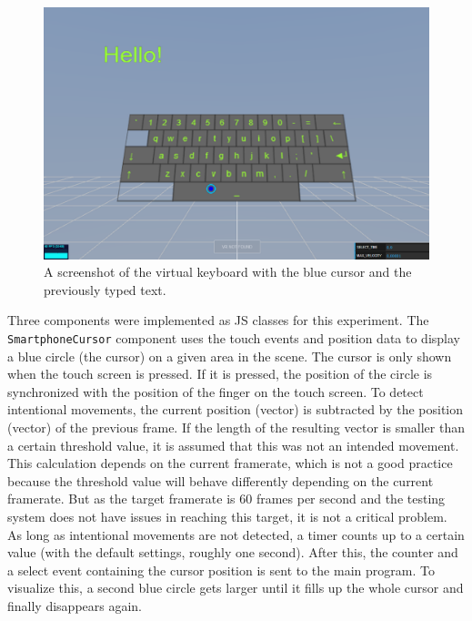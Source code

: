 \begin{figure}[H]
  \centering
  \includegraphics[width=12cm]{figures/implementation/screenshot_exp_vk.png}
  \caption[Screenshot of the virtual keyboard experiment]{A screenshot of the virtual keyboard with the blue cursor and the previously typed text.}\label{fig:screenshot-exp-vk}
\end{figure}

Three components were implemented as \acl{JS} classes for this experiment. The \lstinline{SmartphoneCursor} component uses the touch events and position data to display a blue circle (the cursor) on a given area in the scene. The cursor is only shown when the touch screen is pressed. If it is pressed, the position of the circle is synchronized with the position of the finger on the touch screen. To detect intentional movements, the current position (vector) is subtracted by the position (vector) of the previous frame. If the length of the resulting vector is smaller than a certain threshold value, it is assumed that this was not an intended movement. This calculation depends on the current framerate, which is not a good practice because the threshold value will behave differently depending on the current framerate. But as the target framerate is 60 frames per second and the testing system does not have issues in reaching this target, it is not a critical problem.
As long as intentional movements are not detected, a timer counts up to a certain value (with the default settings, roughly one second). After this, the counter and a select event containing the cursor position is sent to the main program. To visualize this, a second blue circle gets larger until it fills up the whole cursor and finally disappears again. 

